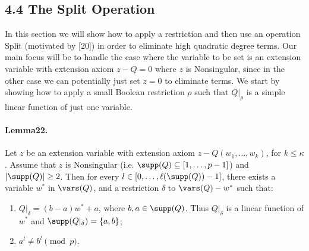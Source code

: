 \subsection*{4.4 The Split Operation}
In this section we will show how to apply a restriction and then use an operation Split (motivated by [20]) in order to eliminate high quadratic degree terms. Our main focus will be to handle the case where the variable to be set is an extension variable with extension axiom $z-Q=0$ where $z$ is Nonsingular, since in the other case we can potentially just set $z=0$ to eliminate terms. We start by showing how to apply a small Boolean restriction $\rho$ such that $Q|_{\rho}$ is a simple linear function of just one variable.
\paragraph{Lemma22.} Let $z$ be an extension variable with extension axiom $z-Q(w_1,\ldots,w_k)$, for $k\leq\kappa$. Assume that $z$ is Nonsingular (i.e. $\supp(Q)\subseteq[1,\ldots,p-1]$) and $|\supp(Q)|\geq2$. Then for every $l\in[0,\ldots,\ell(\supp(Q))-1]$, there exists a variable $w^*$ in $\vars(Q)$, and a restriction $\delta$ to $\vars(Q)-w^*$ such that:
\begin{enumerate}[label=(\arabic*)]
\item $Q|_{\delta}=(b-a)w^*+a$, where $b,a\in\supp(Q)$. Thus $Q|_{\delta}$ is a linear function of $w^*$ and $\supp(Q|_{\delta})=\{a,b\}$;
\item $a^l\neq b^l\pmod p$.
\end{enumerate}
